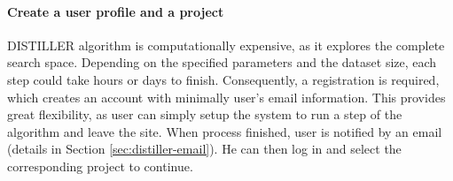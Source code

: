 \paragraph{Create a user profile and a project}
DISTILLER algorithm is computationally expensive, as it explores the complete
search space. Depending on the specified parameters and the dataset size, each
step could take hours or days to finish.  
%
Consequently, a registration is required, which creates an account with
minimally user's email information.  This provides great flexibility, as user
can simply setup the system to run a step of the algorithm and leave the site.
When process finished, user is notified by an email (details in Section
\ref{sec:distiller-email}).  He can then log in and select the corresponding
project to continue.



